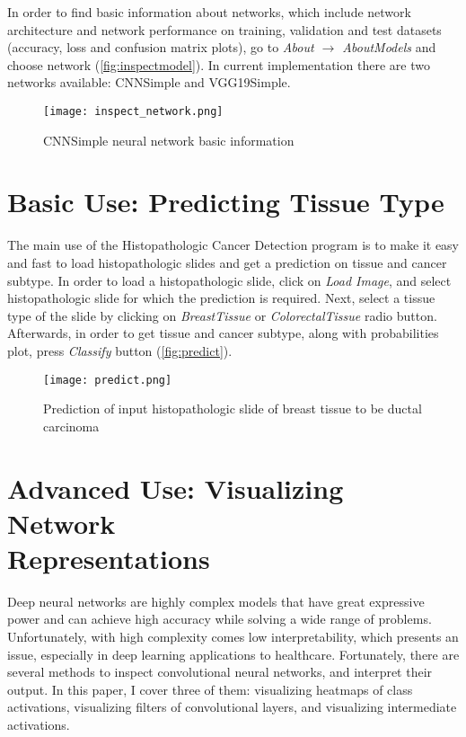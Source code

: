 In order to find basic information about networks, which include network architecture and network performance on training, validation and test datasets (accuracy, loss and confusion matrix plots), go to \emph{About $\rightarrow$ About\;Models} and choose network (\textcolor{red}{\autoref{fig:inspectmodel}}). In current implementation there are two networks available: CNNSimple and VGG19Simple.
\clearpage

\begin{figure}[h]
	\centering
	\texttt{[image: inspect\_network.png]}
	\caption{CNNSimple neural network basic information}
	\label{fig:inspectmodel}
\end{figure}

\section{Basic Use: Predicting Tissue Type}
\label{basicuse}

The main use of the Histopathologic Cancer Detection program is to make it easy and fast to load histopathologic slides and get a prediction on tissue and cancer subtype. In order to load a histopathologic slide, click on \emph{Load\; Image}, and select histopathologic slide for which the prediction is required. Next, select a tissue type of the slide by clicking on \emph{Breast\;Tissue} or \emph{Colorectal\;Tissue} radio button. Afterwards, in order to get tissue and cancer subtype, along with probabilities plot, press \emph{Classify} button (\textcolor{red}{\autoref{fig:predict}}).

\begin{figure}[h]
	\centering
	\texttt{[image: predict.png]}
	\caption{Prediction of input histopathologic slide of breast tissue to be ductal carcinoma}
	\label{fig:predict}
\end{figure}

\section{Advanced Use: Visualizing Network \\Representations}
\label{advuse}

Deep neural networks are highly complex models that have great expressive power and can achieve high accuracy while solving a wide range of problems. Unfortunately, with high complexity comes low interpretability, which presents an issue, especially in deep learning applications to healthcare. Fortunately, there are several methods to inspect convolutional neural networks, and interpret their output. In this paper, I cover three of them: visualizing heatmaps of class activations, visualizing filters of convolutional layers, and visualizing intermediate activations.

